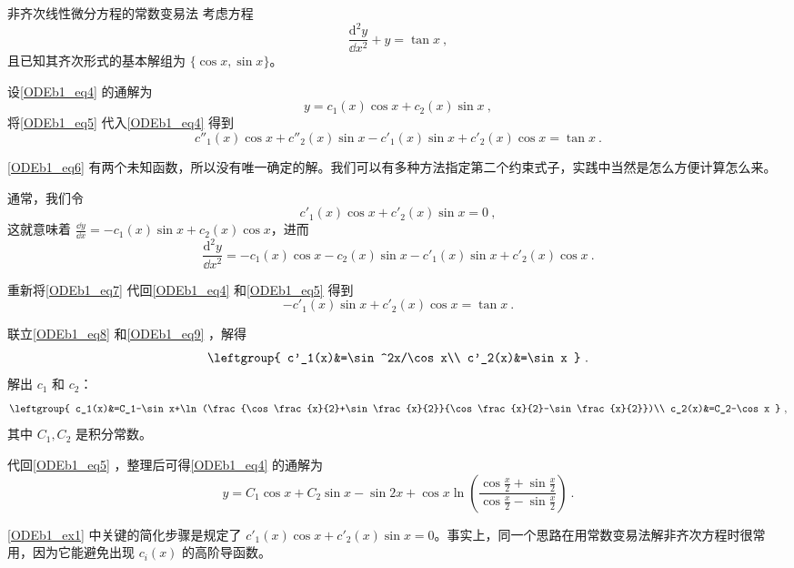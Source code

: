 \begin{example}{非齐次线性微分方程的常数变易法}\label{ODEb1_ex1}
考虑方程
\begin{equation}\label{ODEb1_eq4}
\frac{\mathrm{d}^2 y}{\dd x^2}+y=\tan x~,
\end{equation}
且已知其齐次形式的基本解组为 $\{\cos x, \sin x\}$。

设\autoref{ODEb1_eq4} 的通解为
\begin{equation}\label{ODEb1_eq5}
y=c_1(x)\cos x+c_2(x)\sin x~,
\end{equation}
将\autoref{ODEb1_eq5} 代入\autoref{ODEb1_eq4} 得到
\begin{equation}\label{ODEb1_eq6}
c''_1(x)\cos x+c''_2(x)\sin x-c'_1(x)\sin x+c'_2(x)\cos x=\tan x~.
\end{equation}

\autoref{ODEb1_eq6} 有两个未知函数，所以没有唯一确定的解。我们可以有多种方法指定第二个约束式子，实践中当然是怎么方便计算怎么来。

通常，我们令
\begin{equation}\label{ODEb1_eq8}
c'_1(x)\cos x+c'_2(x)\sin x=0~,
\end{equation}
这就意味着 $\frac{\dd y}{\dd x}=-c_1(x)\sin x+c_2(x)\cos x$，进而
\begin{equation}\label{ODEb1_eq7}
\frac{\mathrm{d}^2 y}{\dd x^2}=-c_1(x)\cos x-c_2(x)\sin x-c'_1(x)\sin x+c'_2(x)\cos x~.
\end{equation}

重新将\autoref{ODEb1_eq7} 代回\autoref{ODEb1_eq4} 和\autoref{ODEb1_eq5} 得到
\begin{equation}\label{ODEb1_eq9}
-c'_1(x)\sin x+c'_2(x)\cos x=\tan x~.
\end{equation}

联立\autoref{ODEb1_eq8} 和\autoref{ODEb1_eq9} ，解得
\begin{equation}
\leftgroup{
c'_1(x)&=\sin^2x/\cos x\\
c'_2(x)&=\sin x
}~.
\end{equation}
解出 $c_1$ 和 $c_2$：
\begin{equation}
\leftgroup{
    c_1(x)&=C_1-\sin x+\ln(\frac{\cos\frac{x}{2}+\sin\frac{x}{2}}{\cos\frac{x}{2}-\sin\frac{x}{2}})\\
    c_2(x)&=C_2-\cos x
}~,
\end{equation}
其中 $C_1, C_2$ 是积分常数。

代回\autoref{ODEb1_eq5} ，整理后可得\autoref{ODEb1_eq4} 的通解为
\begin{equation}
y=C_1\cos x+C_2\sin x-\sin 2x+\cos x\ln(\frac{\cos\frac{x}{2}+\sin\frac{x}{2}}{\cos\frac{x}{2}-\sin\frac{x}{2}})~.
\end{equation}




\end{example}


\autoref{ODEb1_ex1} 中关键的简化步骤是规定了 $c'_1(x)\cos x+c'_2(x)\sin x=0$。事实上，同一个思路在用常数变易法解非齐次方程时很常用，因为它能避免出现 $c_i(x)$ 的高阶导函数。
















